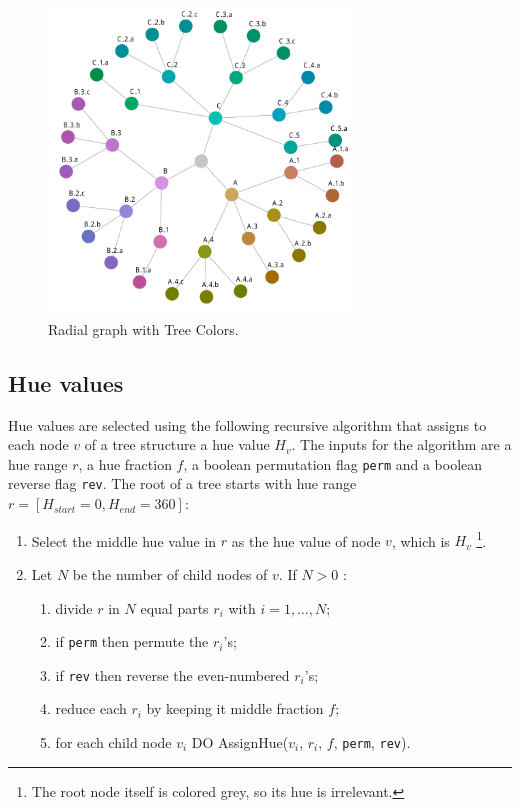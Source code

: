 \documentclass[journal]{vgtc}                %
\begin{document}
\begin{figure}[tb]

  \centering
  \includegraphics[width=3.2in]{HCPgraph.pdf}
  \caption{Radial graph with Tree Colors.}\label{fig:graph}

\end{figure}

\subsection{Hue values}
Hue values are selected using the following recursive algorithm that assigns to each node 
$v$ of a tree structure a hue value $H_{v}$. 
The inputs for the algorithm are a hue range $r$, a hue fraction $f$, a boolean permutation flag  
\texttt{perm} and a boolean reverse flag \texttt{rev}.
The root of a tree starts with hue range $r=[H_{start}=0, H_{end}=360]$:

%
\begin{enumerate} \itemsep1pt \parskip0pt 
\item Select the middle hue value in $r$ as the hue value of node $v$, which is $H_v$ \footnote{The root node itself is colored grey, so its hue is irrelevant.}.
\item Let $N$ be the number of child nodes of $v$. If $N>0$ :
\begin{enumerate}[i] \itemsep1pt \parskip0pt 
\item divide $r$ in $N$ equal parts $r_i$ with $i=1,\ldots,N$;
\item if \texttt{perm} then permute the $r_i$'s;
\item if \texttt{rev} then reverse the even-numbered $r_i$'s;
\item reduce each $r_i$ by keeping it middle fraction $f$;
\item for each child node $v_i$ DO AssignHue($v_i$, $r_i$, $f$, \texttt{perm}, \texttt{rev}).
\end{enumerate}
\end{enumerate}
\end{document}
